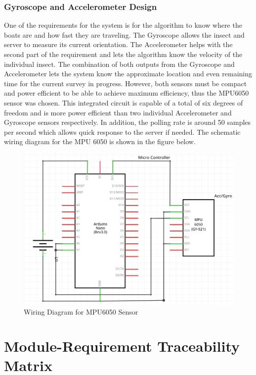 \documentclass[11pt]{article}
\begin{document}
\subsubsection{Gyroscope and Accelerometer Design}
One of the requirements for the system is for the algorithm to know where the boats are and how fast they are traveling. The Gyroscope allows the insect and server to measure its current orientation. The Accelerometer helps with the second part of the requirement and lets the algorithm know the velocity of the individual insect. The combination of both outputs from the Gyroscope and Accelerometer lets the system know the approximate location and even remaining time for the current survey in progress. However, both sensors must be compact and power efficient to be able to achieve maximum efficiency, thus the MPU6050 sensor was chosen. This integrated circuit is capable of a total of six degrees of freedom and is more power efficient than two individual Accelerometer and Gyroscope sensors respectively. In addition, the polling rate is around 50 samples per second which allows quick response to the server if needed. The schematic wiring diagram for the MPU 6050 is shown in the figure below.  
\begin{figure}[H]
   \centering
   \includegraphics[width=\textwidth]{img/MPU6050Wiring.png}
   \caption{Wiring Diagram for MPU6050 Sensor}
\end{figure}

\section{Module-Requirement Traceability Matrix}
\end{document}
